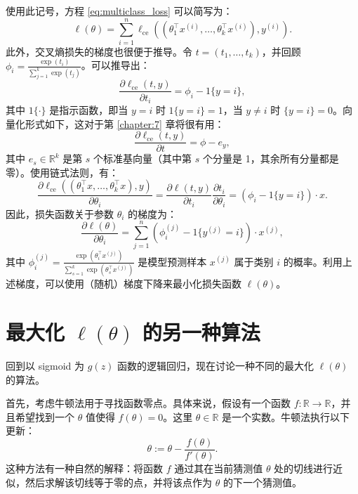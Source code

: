使用此记号，方程 \eqref{eq:multiclass_loss} 可以简写为：
\begin{equation}
    \ell(\theta) = \sum_{i=1}^n \ell_{\text{ce}}((\theta_1^\top x^{(i)}, \dots, \theta_k^\top x^{(i)}), y^{(i)}).
\end{equation}
此外，交叉熵损失的梯度也很便于推导。令 $t = (t_1, \dots, t_k)$，并回顾 $\phi_i = \frac{\exp(t_i)}{\sum_{j=1}^k \exp(t_j)}$。可以推导出：
\begin{equation}
    \frac{\partial \ell_{\text{ce}}(t, y)}{\partial t_i} = \phi_i - {1}\{y=i\},
\end{equation}
其中 ${1}\{\cdot\}$ 是指示函数，即当 $y=i$ 时 ${1}\{y=i\} = 1$，当 $y \ne i$ 时 $\{y=i\} = 0$。向量化形式如下，这对于第 \ref{chapter:7} 章将很有用：
\begin{equation}
    \frac{\partial \ell_{\text{ce}}(t, y)}{\partial t} = \phi - e_y,\label{eq:2.17}
\end{equation}
其中 $e_s \in \mathbb{R}^k$ 是第 $s$ 个标准基向量（其中第 $s$ 个分量是 1，其余所有分量都是零）。使用链式法则，有：
\begin{equation}
    \frac{\partial \ell_{\text{ce}}((\theta_1^\top x, \dots, \theta_k^\top x), y)}{\partial \theta_i} = \frac{\partial \ell(t, y)}{\partial t_i} \frac{\partial t_i}{\partial \theta_i} = (\phi_i - {1}\{y=i\}) \cdot x.
\end{equation}
因此，损失函数关于参数 $\theta_i$ 的梯度为：
\begin{equation}
    \frac{\partial \ell(\theta)}{\partial \theta_i} = \sum_{j=1}^n (\phi_i^{(j)} - {1}\{y^{(j)}=i\}) \cdot x^{(j)},
\end{equation}
其中 $\phi_i^{(j)} = \frac{\exp(\theta_i^\top x^{(j)})}{\sum_{s=1}^k \exp(\theta_s^\top x^{(j)})}$ 是模型预测样本 $x^{(j)}$ 属于类别 $i$ 的概率。利用上述梯度，可以使用（随机）梯度下降来最小化损失函数 $\ell(\theta)$。

\section{最大化 $\ell(\theta)$ 的另一种算法}

回到以 sigmoid 为 $g(z)$ 函数的逻辑回归，现在讨论一种不同的最大化 $\ell(\theta)$ 的算法。

首先，考虑牛顿法用于寻找函数零点。具体来说，假设有一个函数 $f: \mathbb{R} \to \mathbb{R}$，并且希望找到一个 $\theta$ 值使得 $f(\theta) = 0$。这里 $\theta \in \mathbb{R}$ 是一个实数。牛顿法执行以下更新：
\[
    \theta := \theta - \frac{f(\theta)}{f'(\theta)}.
\]
这种方法有一种自然的解释：将函数 $f$ 通过其在当前猜测值 $\theta$ 处的切线进行近似，然后求解该切线等于零的点，并将该点作为 $\theta$ 的下一个猜测值。

